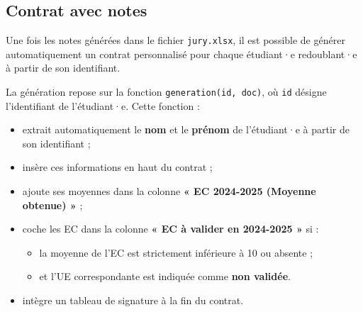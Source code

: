 \subsection{Contrat avec notes }

Une fois les notes générées dans le fichier \texttt{jury.xlsx}, il est possible de générer automatiquement un contrat personnalisé pour chaque étudiant·e redoublant·e à partir de son identifiant.

\vspace{0.5em}
La génération repose sur la fonction \texttt{generation(id, doc)}, où \texttt{id} désigne l'identifiant de l’étudiant·e. Cette fonction :
\begin{itemize}
    \item extrait automatiquement le \textbf{nom} et le \textbf{prénom} de l’étudiant·e à partir de son identifiant ;
    \item insère ces informations en haut du contrat ;
    \item ajoute ses moyennes dans la colonne \textbf{« EC 2024-2025 (Moyenne obtenue) »} ;
    \item coche les EC dans la colonne \textbf{« EC à valider en 2024-2025 »} si :
        \begin{itemize}
            \item la moyenne de l’EC est strictement inférieure à 10 ou absente ;
            \item et l’UE correspondante est indiquée comme \textbf{non validée}.
        \end{itemize}
    \item intègre un tableau de signature à la fin du contrat.
\end{itemize}

